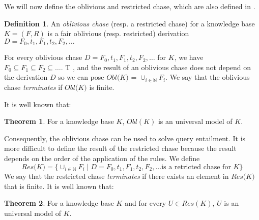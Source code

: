 \documentclass{article}
\theoremstyle{definition}
\newtheorem{definition}{Definition}[section]
\newtheorem{theorem}{Theorem}[section]
\theoremstyle{remark}
\def \N {\mathbb N}
\begin{document}
We will now define the oblivious and restricted chase, which are also defined in \cite{obl_res}.


\begin{definition}
An \emph{oblivious chase} (resp. a restricted chase) for a knowledge base $K= (F,R)$ is a fair oblivious (resp. restricted) derivation $D=F_0,t_1,F_1,t_2,F_2,\ldots$ 
\end{definition}

For every oblivious chase $D = F_0,t_1,F_1,t_2,F_2,\ldots$ for $K$, we have $F_0 \subseteq F_1 \subseteq F_2 \subseteq \ldots$. T
, and the result of an oblivious chase does not depend on the derivation $D$ so we can pose \emph{$\textit{Obl(K)}$} = $\cup_{i \in \N}F_i$. We say that the oblivious chase \emph{terminates} if $\textit{Obl(K)}$ is finite.

It is well known that:

\begin{theorem}
For a knowledge base $K$, $\textit{Obl}(K)$ is an universal model of $K$.
\end{theorem}

Consequently, the oblivious chase can be used to solve query entailment. It is more difficult to define the result of the restricted chase because the result depends on the order of the application of the rules. We define $$\textit{Res(K)}=\{\cup_{i \in \N}F_i \mid D = F_0,t_1,F_1,t_2,F_2,\ldots \text{is a retricted chase for } K\}$$ We say that the restricted chase \emph{terminates} if there exists an element in $\textit{Res(K)}$ that is finite. It is well known that:

\begin{theorem}
For a knowledge base $K$ and for every $U \in \textit{Res}(K)$, $U$ is an universal model of $K$.
\end{theorem}
\end{document}

